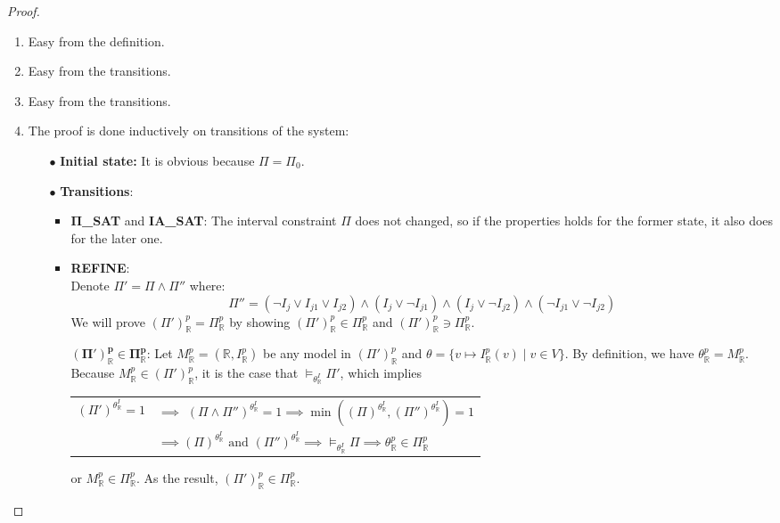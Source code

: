 \begin{proof}   
\begin{enumerate}
\item Easy from the definition.
\item Easy from the transitions.
\item Easy from the transitions.
\item The proof is done inductively on transitions of the system:
\begin{itemize}
\item[$\bullet$] \sloppy \textbf{Initial state:} It is obvious because $\Pi = \Pi_0$.
\item[$\bullet$] \textbf{Transitions}:
\begin{itemize}
\item \textbf{$\pmb\Pi$\_SAT} and \textbf{IA\_SAT}: The interval constraint $\Pi$ does not changed, so if the properties holds for the former state, it also does for the later one.
\item \sloppy \textbf{REFINE}: \\ Denote ${\Pi' = \Pi \wedge \Pi''}$ where: \[\Pi'' = (\neg I_j \vee I_{j1} \vee I_{j2}) \wedge (I_j \vee \neg I_{j1}) \wedge (I_j \vee \neg I_{j2}) \wedge (\neg I_{j1} \vee \neg I_{j2})\] We will prove $(\Pi')^p_\mathbb{R} = \Pi^p_\mathbb{R}$ by showing $(\Pi')^p_\mathbb{R} \in \Pi^p_\mathbb{R}$ and $(\Pi')^p_\mathbb{R} \ni \Pi^p_\mathbb{R}$.

$\pmb{(\Pi')^p_\mathbb{R} \in \Pi^p_\mathbb{R}}$: Let $M^p_\mathbb{R}=(\mathbb{R}, I^p_\mathbb{R})$ be any model in $(\Pi')^p_\mathbb{R}$ and ${\theta = \{v \mapsto I^p_\mathbb{R}(v) \mid v \in V\}}$. By definition, we have $\theta^p_\mathbb{R}=M^p_\mathbb{R}$. Because $M^p_\mathbb{R} \in (\Pi')^p_\mathbb{R}$, it is the case that $\models_{\theta^I_\mathbb{R}} \Pi'$, which implies
\begin{tabular} {l l}
$(\Pi')^{\theta^I_\mathbb{R}} = 1$ &$\implies$ $(\Pi \wedge \Pi'' )^{\theta^I_\mathbb{R}} = 1 \implies \min((\Pi)^{\theta^I_\mathbb{R}}, (\Pi'')^{\theta^I_\mathbb{R}}) = 1$ \\
&$\implies (\Pi)^{\theta^I_\mathbb{R}} \text{ and } (\Pi'')^{\theta^I_\mathbb{R}} \implies \models_{\theta^I_\mathbb{R}} \Pi \implies \theta^p_\mathbb{R} \in \Pi^p_\mathbb{R}$
\end{tabular}

or $M^p_\mathbb{R} \in \Pi^p_\mathbb{R}$. As the result, $(\Pi')^p_\mathbb{R} \in \Pi^p_\mathbb{R}$.


\end{itemize}
\end{itemize}
\end{enumerate}
\end{proof}
